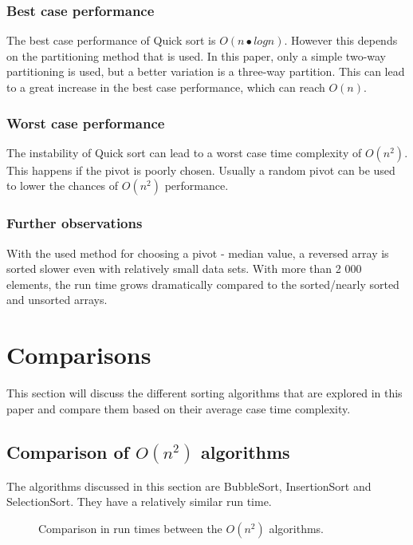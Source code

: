 \documentclass{acm_proc_article-sp}
\begin{document}
\subsubsection{Best case performance}

The best case performance of Quick sort is $O(n•logn)$. However this depends on the partitioning method that is used. In this paper, only a simple two-way partitioning is used, but a better variation is a three-way partition. This can lead to a great increase in the best case performance, which can reach $O(n)$. 

\subsubsection{Worst case performance}

The instability of Quick sort can lead to a worst case time complexity of $O(n^{2})$. This happens if the pivot is poorly chosen. Usually a random pivot can be used to lower the chances of $O(n^{2})$ performance.

\subsubsection{Further observations}

With the used method for choosing a pivot - median value, a reversed array is sorted slower even with relatively small data sets. With more than 2 000 elements, the run time grows dramatically compared to the sorted/nearly sorted and unsorted arrays.

\section{Comparisons}

This section will discuss the different sorting algorithms that are explored in this paper and compare them based on their average case time complexity.

\subsection{Comparison of $O(n^{2})$ algorithms}

The algorithms discussed in this section are BubbleSort, InsertionSort and SelectionSort. They have a relatively similar run time.

\begin{figure}[!htb]
\caption{Comparison in run times between the $O(n^{2})$ algorithms.}
\end{figure}
\end{document}
